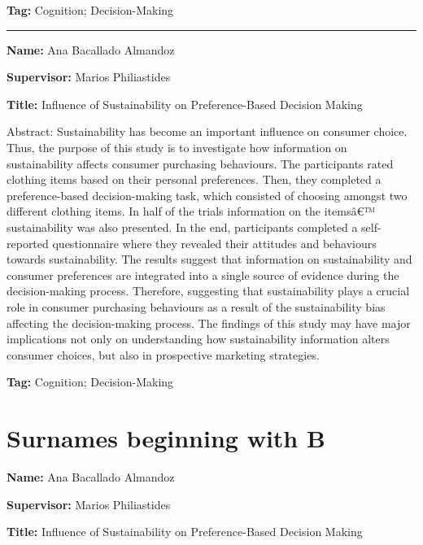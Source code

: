 \documentclass[]{book}
\begin{document}
\textbf{Tag:} Cognition; Decision-Making

\begin{center}\rule{0.5\linewidth}{\linethickness}\end{center}

\textbf{Name:} Ana Bacallado Almandoz

\textbf{Supervisor:} Marios Philiastides

\textbf{Title:} Influence of Sustainability on Preference-Based Decision Making

Abstract: Sustainability has become an important influence on consumer choice. Thus, the purpose of this study is to investigate how information on sustainability affects consumer purchasing behaviours. The participants rated clothing items based on their personal preferences. Then, they completed a preference-based decision-making task, which consisted of choosing amongst two different clothing items. In half of the trials information on the itemsâ€™ sustainability was also presented. In the end, participants completed a self-reported questionnaire where they revealed their attitudes and behaviours towards sustainability. The results suggest that information on sustainability and consumer preferences are integrated into a single source of evidence during the decision-making process. Therefore, suggesting that sustainability plays a crucial role in consumer purchasing behaviours as a result of the sustainability bias affecting the decision-making process. The findings of this study may have major implications not only on understanding how sustainability information alters consumer choices, but also in prospective marketing strategies.

\textbf{Tag:} Cognition; Decision-Making

\hypertarget{surnames-beginning-with-b}{%
\section*{Surnames beginning with B}\label{surnames-beginning-with-b}}

\textbf{Name:} Ana Bacallado Almandoz

\textbf{Supervisor:} Marios Philiastides

\textbf{Title:} Influence of Sustainability on Preference-Based Decision Making
\end{document}
